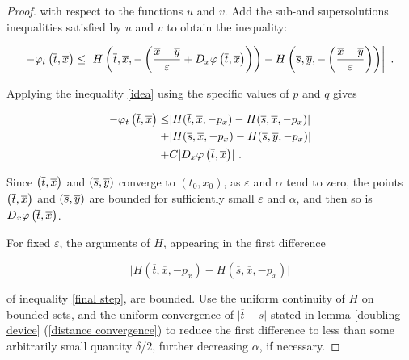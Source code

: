 \begin{theorem}
\begin{proof}
		  		with respect to the functions $ u $ and $ v. $ Add the sub-and supersolutions inequalities satisfied by $ u $ and $ v $ to obtain the inequality:
		  		
		  		\begin{equation*}
		  			- \varphi_t\left(\overline{t}, \overline{x}\right) 
		  			\leq \left\lvert H \left( \overline{t}, \overline{x}, - \left( \frac{\overline{x} - \overline{y}}{\varepsilon} + D_x \varphi\left(\overline{t}, \overline{x}\right) \right)  \right)
		  			- H \left( \overline{s}, \overline{y}, - \left( \frac{\overline{x} - \overline{y}}{\varepsilon} \right) \right) \right\rvert \ .
		  		\end{equation*}
		  		
		  		Applying the inequality \eqref{idea} using the specific values of $ p $ and $ q $ gives
		  		
		  		\begin{equation}
		  		\label{final step}
		  			\begin{split}
		  				- \varphi_t\left(\overline{t}, \overline{x}\right) \leq
		  				&\lvert H(\overline{t}, \overline{x}, -p_x) - H(\overline{s}, \overline{x}, -p_x) \rvert \\
		  				+&\lvert H(\overline{s}, \overline{x}, -p_x) - H(\overline{s}, \overline{y}, -p_x) \rvert \\
		  				+& C \lvert D_x \varphi\left(\overline{t}, \overline{x}\right) \rvert \ .
		  			\end{split}
		  		\end{equation}
		  		
		  		Since $ \left(\overline{t}, \overline{x}\right) $ and $ \left(\overline{s}, \overline{y}\right) $ converge to $ (t_0, x_0) $, as $ \varepsilon $ and $ \alpha $ tend to zero, the points $ \left(\overline{t}, \overline{x}\right) $ and $ \left(\overline{s}, \overline{y}\right) $ are bounded for sufficiently small $ \varepsilon $ and $ \alpha $, and then so is $ D_x \varphi\left(\overline{t}, \overline{x}\right) $.
		  		
		  		For fixed $ \varepsilon $, the arguments of $ H $, appearing in the first difference 
		  		
		  		\begin{equation*}
		  			\lvert H(\overline{t}, \overline{x}, -p_x) - H(\overline{s}, \overline{x}, -p_x) \rvert 
		  		\end{equation*}
		  		
		  		of inequality \eqref{final step}, 
		  		are bounded. Use the uniform continuity of $ H $ on bounded sets, and the uniform convergence of $ \lvert \overline{t} - \overline{s} \rvert $ stated in lemma \ref{doubling device} (\ref{distance convergence}) to reduce the first difference to less than some arbitrarily small quantity $ \delta / 2 $, further decreasing $ \alpha $, if necessary.
		  		

\end{proof}
\end{theorem}
